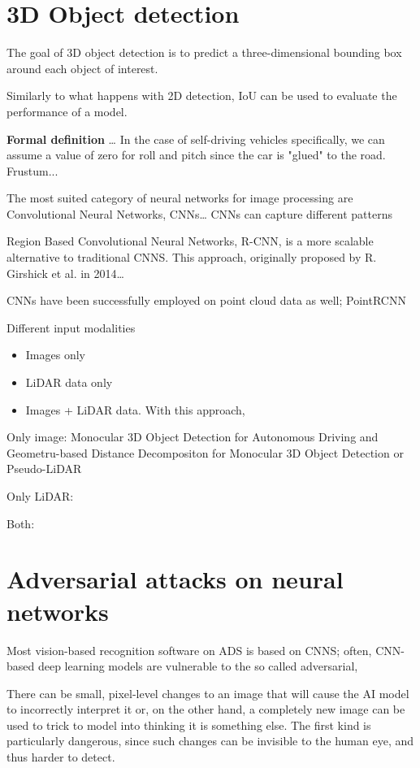 \section{3D Object detection}
The goal of 3D object detection is to predict a three-dimensional bounding box around each object of interest.

Similarly to what happens with 2D detection, IoU can be used to evaluate the performance of a model.


\textbf{Formal definition}
\dots
In the case of self-driving vehicles specifically, we can assume a value of zero for roll and pitch since the car is "glued" to the road.
Frustum...



The most suited category of neural networks for image processing are Convolutional Neural Networks, CNNs\dots
CNNs can capture different patterns 

Region Based Convolutional Neural Networks, R-CNN, is a more scalable alternative to traditional CNNS. This approach, originally proposed by R. Girshick et al. \cite{DBLP:conf/cvpr/GirshickDDM14} in 2014\dots

CNNs have been successfully employed on point cloud data as well; PointRCNN


Different input modalities
\begin{itemize}
    \item Images only
    \item LiDAR data only
    \item Images + LiDAR data. With this approach, 
\end{itemize}


Only image: Monocular 3D Object Detection for Autonomous Driving and Geometru-based Distance Decompositon for Monocular 3D Object Detection or Pseudo-LiDAR

Only LiDAR: 

Both:





\newpage
\section{Adversarial attacks on neural networks}
Most vision-based recognition software on ADS is based on CNNS; often, CNN-based deep learning models are vulnerable to the so called adversarial, 

There can be small, pixel-level changes to an image that will cause the AI model to incorrectly interpret it or, on the other hand, a completely new image can be used to trick to model into thinking it is something else. The first kind is particularly dangerous, since such changes can be invisible to the human eye, and thus harder to detect.


